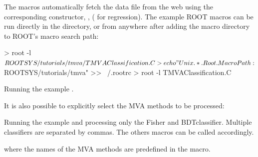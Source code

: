 The macros automatically fetch the data file from 
the web using the corresponding  constructor, \eg,
 ( for regression). The example %
ROOT macros can be run directly in the \TmvaTutorialDir directory,
or from anywhere after adding the macro directory 
to ROOT's macro search path:
\begin{codeexample}
\begin{tmvacode}
> root -l $ROOTSYS/tutorials/tmva/TMVAClassification.C
> echo "Unix.*.Root.MacroPath: $ROOTSYS/tutorials/tmva" >> ~/.rootrc
> root -l TMVAClassification.C
\end{tmvacode}
\caption[.]{\codeexampleCaptionSize Running the example .}
\end{codeexample}

It is also possible to explicitly select the MVA methods to be processed: 
\begin{codeexample}
\caption[.]{\codeexampleCaptionSize Running the example  and processing only the Fisher and BDTclassifier. Multiple classifiers are separated by commas. The others macros can be called accordingly.}
\end{codeexample}
where the names of the MVA methods are predefined in the macro. 

